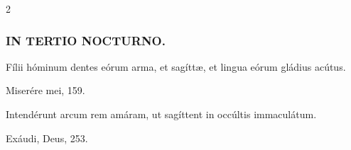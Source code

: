 \documentclass[9pt,twoside]{extarticle}
\begin{document}
\begin{multicols}{2}
\subsubsection*{\center \textsc{IN TERTIO NOCTURNO.}}
\begin{tightlist}{}
\item {} Fílii hóminum dentes eórum arma, et sagíttæ, et lingua eórum gládius acútus. 
\item {} Miserére mei, 159.
\end{tightlist}

%
%
%
%
%
%
%
%
%
%
%
%
%
%
%

\begin{tightlist}{}
\item {} Intendérunt arcum rem amáram, ut sagíttent in occúltis immaculátum.
\item {} Exáudi, Deus, 253.
\end{tightlist}


\end{multicols}
\end{document}
